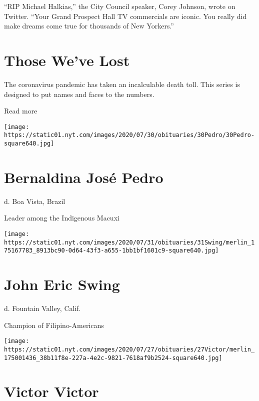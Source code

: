 ``RIP Michael Halkias,'' the City Council speaker, Corey Johnson, wrote
on Twitter. ``Your Grand Prospect Hall TV commercials are iconic. You
really did make dreams come true for thousands of New Yorkers.''

\href{https://www.nytimes.com/interactive/2020/obituaries/people-died-coronavirus-obituaries.html?action=click\&pgtype=Article\&state=default\&region=BELOW_MAIN_CONTENT\&context=covid_obits_promo}{}

\hypertarget{those-weve-lost}{%
\section{Those We've Lost}\label{those-weve-lost}}

The coronavirus pandemic has taken an incalculable death toll. This
series is designed to put names and faces to the numbers.

Read more

\texttt{[image: https://static01.nyt.com/images/2020/07/30/obituaries/30Pedro/30Pedro-square640.jpg]}

\hypertarget{bernaldina-josuxe9-pedro}{%
\section{Bernaldina José Pedro}\label{bernaldina-josuxe9-pedro}}

d. Boa Vista, Brazil

Leader among the Indigenous Macuxi

\texttt{[image: https://static01.nyt.com/images/2020/07/31/obituaries/31Swing/merlin\_175167783\_8913bc90-0d64-43f3-a655-1bb1bf1601c9-square640.jpg]}

\hypertarget{john-eric-swing}{%
\section{John Eric Swing}\label{john-eric-swing}}

d. Fountain Valley, Calif.

Champion of Filipino-Americans

\texttt{[image: https://static01.nyt.com/images/2020/07/27/obituaries/27Victor/merlin\_175001436\_38b11f8e-227a-4e2c-9821-7618af9b2524-square640.jpg]}

\hypertarget{victor-victor}{%
\section{Victor Victor}\label{victor-victor}}

